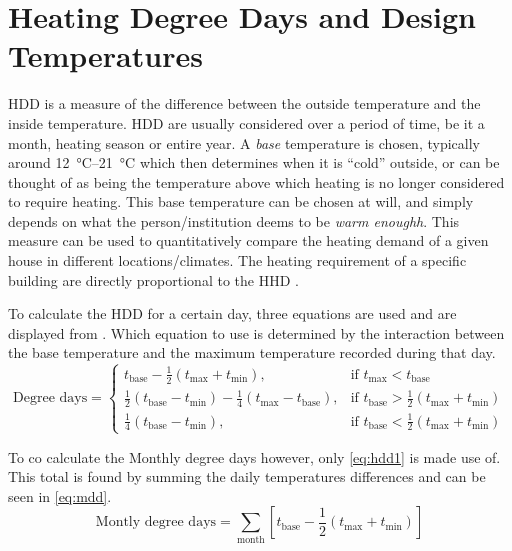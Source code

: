 \section{Heating Degree Days and Design Temperatures} \label{sec:hddanddesign}
\acs{HDD} is a measure of the difference between the outside temperature and the inside temperature. \acs{HDD} are usually considered over a period of time, be it a month, heating season or entire year. A \textit{base} temperature is chosen, typically around \qtyrange{12}{21}{\celsius} which then determines when it is ``cold'' outside, or can be thought of as being the temperature above which heating is no longer considered to require heating. This base temperature can be chosen at will, and simply depends on what the person/institution deems to be \textit{warm enoughh}. This measure can be used to quantitatively compare the heating demand of a given house in different locations/climates. The heating requirement of a specific building are directly proportional to the \ac{HHD} \cite{chartered_institution_of_building_services_engineers_environmental_2006}.

To calculate  the \ac{HDD} for a certain day, three equations are used and are displayed from . Which equation to use is determined by the interaction between the base temperature and the maximum temperature recorded during that day.  
\begin{equation}
    \text{Degree days} = \begin{cases}
        t_\text{base} - \frac12(t_\text{max} + t_\text{min}), & \text{if } t_\text{max} < t_\text{base} \label{eq:hdd1}\\
        \frac12(t_\text{base} - t_\text{min}) -\frac14(t_\text{max} -t_\text{base} ), & \text{if } t_\text{base} > \frac12(t_\text{max} + t_\text{min}) \\
        \frac14(t_\text{base} -t_\text{min} ), & \text{if } t_\text{base} <\frac12(t_\text{max} + t_\text{min}) \label{eq:hdd3}
     \end{cases}  
\end{equation}

To co calculate the Monthly degree days however, only \cref{eq:hdd1} is made use of. This total is found by summing the daily temperatures differences and can be seen in \cref{eq:mdd}.
\begin{equation}
    \text{Montly degree days} = \displaystyle\sum_\text{month} \left[t_\text{base} - \frac12(t_\text{max} + t_\text{min})\right] 
\end{equation}

